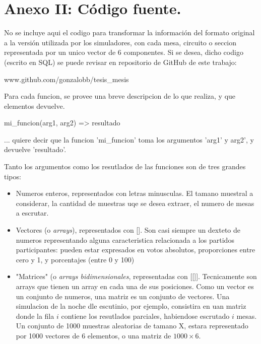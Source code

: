 \section{Anexo II: C\'odigo fuente.}

No se incluye aqui el codigo para transformar la informaci\'on del formato original a la versi\'on utilizada por los simuladores, con cada mesa, circuito o seccion representada por un unico vector de 6 componentes. Si se desea, dicho codigo (escrito en SQL) se puede revisar en repositorio de GitHub de este trabajo:

www.github.com/gonzalobb/tesis_mesis 

Para cada funcion, se provee una breve descripcion de lo que realiza, y que elementos devuelve.

  mi_funcion(arg1, arg2) => resultado

... quiere decir que la funcion 'mi_funcion' toma los argumentos 'arg1' y arg2', y devuelve 'resultado'.

Tanto los argumentos como los resutlados de las funciones son de tres grandes tipos:

\begin{center}
  \begin{itemize}
  \item Numeros enteros, representados con letras minusculas. El tamano muestral a considerar, la cantidad de muestras uqe se desea extraer, el numero de mesas a escrutar.
\item Vectores (o \textit{arrays}), representados con []. Son casi siempre un dexteto de numeros representando alguna caracteristica relacionada a los partidos participantes: pueden estar expresados en votos absolutos, proporciones entre cero y 1, y porcentajes (entre 0 y 100)

\item "Matrices" (o \textit{arrays bidimensionales}, representadas con [[]]. Tecnicamente son arrays que tienen un array en cada una de sus posiciones. Como un vector es un conjunto de numeros, una matriz es un conjunto de vectores. Una simulacion de la noche dle escutinio, por ejemplo, consistira en uan matriz donde la fila $i$ contiene los resutlados parciales, habiendose escrutado $i$ mesas. Un conjunto de 1000 muestras aleatorias de tamano X, estara representado por 1000 vectores de 6 elementos, o una matriz de $ 1000 \times 6 $.
\end{itemize}
\end{center}

